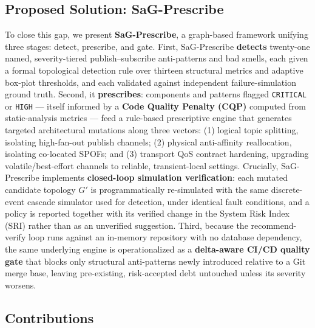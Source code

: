 \documentclass[11pt]{article}
\begin{document}
\subsection{Proposed Solution: SaG-Prescribe}

To close this gap, we present \textbf{SaG-Prescribe}, a graph-based framework unifying three stages:
detect, prescribe, and gate. First, SaG-Prescribe \textbf{detects} twenty-one named, severity-tiered
publish--subscribe anti-patterns and bad smells, each given a formal topological detection rule over
thirteen structural metrics and adaptive box-plot thresholds, and each validated against independent
failure-simulation ground truth. Second, it \textbf{prescribes}: components and patterns flagged
\texttt{CRITICAL} or \texttt{HIGH} --- itself informed by a \textbf{Code Quality Penalty (CQP)}
computed from static-analysis metrics --- feed a rule-based prescriptive engine that generates
targeted architectural mutations along three vectors: (1) logical topic splitting, isolating
high-fan-out publish channels; (2) physical anti-affinity reallocation, isolating co-located SPOFs;
and (3) transport QoS contract hardening, upgrading volatile/best-effort channels to reliable,
transient-local settings. Crucially, SaG-Prescribe implements \textbf{closed-loop simulation
verification}: each mutated candidate topology $G'$ is programmatically re-simulated with the same
discrete-event cascade simulator used for detection, under identical fault conditions, and a policy is
reported together with its verified change in the System Risk Index (SRI) rather than as an unverified
suggestion. Third, because the recommend-verify loop runs against an in-memory repository with no
database dependency, the same underlying engine is operationalized as a \textbf{delta-aware CI/CD
quality gate} that blocks only structural anti-patterns newly introduced relative to a Git merge base,
leaving pre-existing, risk-accepted debt untouched unless its severity worsens.

\subsection{Contributions}
\end{document}
